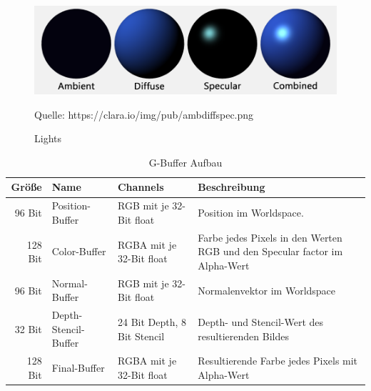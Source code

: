 \begin{figure}
	\centering
	\includegraphics[scale=0.4]{02theorie/amb_diff_spec.png}
		
	Quelle: https://clara.io/img/pub/amb\textunderscore diff\textunderscore spec.png
	\caption{Lights}\label{Img:Lights}
\end{figure}

\begin{table}
	\caption{G-Buffer Aufbau}
	\label{table:GBuffer}
	\centering
	\begin{tabular}{rlll}\toprule[1.5pt]
		Größe & Name & Channels & Beschreibung \\\midrule
		96 Bit  & Position-Buffer & RGB mit je 32-Bit float & Position im Worldspace.\\
		128 Bit & Color-Buffer & RGBA mit je 32-Bit float & Farbe jedes Pixels in den Werten RGB und den Specular factor im Alpha-Wert \\
		96 Bit & Normal-Buffer & RGB mit je 32-Bit float & Normalenvektor im Worldspace \\
		32 Bit & Depth-Stencil-Buffer & 24 Bit Depth, 8 Bit Stencil & Depth- und Stencil-Wert des resultierenden Bildes \\
		128 Bit & Final-Buffer & RGBA mit je 32-Bit float & Resultierende Farbe jedes Pixels mit Alpha-Wert \\\bottomrule[1.5pt]
	\end{tabular}
\end{table}
